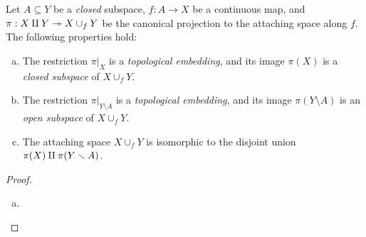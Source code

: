 \begin{proposition}
    \label{prop:attaching-space-properties}
    Let \(A \subseteq Y\) be a \emph{closed} subspace, \(f: A \to X\) be a
    continuous map, and \(\pi: X \amalg Y \twoheadrightarrow X \cup_f Y\) be the canonical
    projection to the attaching space along \(f\). The following properties hold:
    \begin{enumerate}[(a)]\setlength\itemsep{0em}
        \item The restriction \(\pi|_X\) is a \emph{topological embedding}, and its
              image \(\pi(X)\) is a \emph{closed subspace} of \(X \cup_f Y\).

        \item The restriction \(\pi|_{Y \setminus A}\) is a \emph{topological
                  embedding}, and its image \(\pi(Y \setminus A)\) is an \emph{open subspace}
              of \(X \cup_f Y\).

        \item The attaching space \(X \cup_f Y\) is isomorphic to the disjoint union
              \(\pi(X) \amalg \pi(Y \smallsetminus A)\).
    \end{enumerate}
\end{proposition}

\begin{proof}
    \begin{enumerate}[(a)]\setlength\itemsep{0em}
        \item
    \end{enumerate}
\end{proof}

